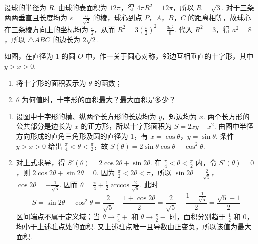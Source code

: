 \begin{problem}
\begin{solution}
\begin{enumerate}
设球的半径为 \(R\). 由球的表面积为 \(12\pi\)，得 \(4\pi R^2=12\pi\)，所以 \(R=\sqrt3\). 对于三条两两垂直且长度均为 \(s=\frac a{\sqrt2}\) 的棱，球心到点 \(P\)，\(A\)，\(B\)，\(C\) 的距离相等，故球心在三条棱方向上的坐标均为 \(\frac s2\)，从而
\(R^2=3\left(\frac s2\right)^2=\frac{3a^2}{8}\).
代入 \(R^2=3\)，得 \(a^2=8\)，所以 \(\triangle ABC\) 的边长为 \(2\sqrt2\).
\end{enumerate}
\end{solution}
\end{problem}

\begin{problem}
如图，在直径为 \(1\) 的圆 \(O\) 中，作一关于圆心对称，邻边互相垂直的十字形，其中 \(y > x > 0\).

\begin{enumerate}
\item 将十字形的面积表示为 \(\theta\) 的函数；
\item \(\theta\) 为何值时，十字形的面积最大？最大面积是多少？
\end{enumerate}


\begin{solution}
\begin{enumerate}
\item 设图中十字形的横、纵两个长方形的长边均为 \(y\)，短边均为 \(x\). 两个长方形的公共部分是边长为 \(x\) 的正方形，所以十字形面积为
\(S=2xy-x^2\).
由图中半径方向形成的直角三角形及圆的直径为 \(1\)，有 \(x=\cos\theta\)，\(y=\sin\theta\). 条件 \(y>x>0\) 给出 \(\frac\pi4<\theta<\frac\pi2\)，故
\(S(\theta)=2\sin\theta\cos\theta-\cos^2\theta\).

\item 对上式求导，得
\(S'(\theta)=2\cos2\theta+\sin2\theta\).
在 \(\frac\pi4<\theta<\frac\pi2\) 内，令 \(S'(\theta)=0\)，则
\(2\cos2\theta+\sin2\theta=0\).
因为 \(\frac\pi2<2\theta<\pi\)，所以 \(\sin2\theta=\frac2{\sqrt5}\)，\(\cos2\theta=-\frac1{\sqrt5}\). 因而
\(\theta=\frac\pi4+\frac12\arccos\frac2{\sqrt5}\).
此时
\[
S=\sin2\theta-\cos^2\theta
=\frac2{\sqrt5}-\frac{1+\cos2\theta}{2}
=\frac2{\sqrt5}-\frac{1-\frac1{\sqrt5}}2
=\frac{\sqrt5-1}{2}
\]
区间端点不属于定义域；当 \(\theta\to\frac\pi4+\) 和 \(\theta\to\frac\pi2-\) 时，面积分别趋于 \(\frac12\) 和 \(0\)，均小于上述驻点处的面积. 又上述驻点唯一且导数由正变负，所以该值为最大面积.
\end{enumerate}
\end{solution}
\end{problem}

